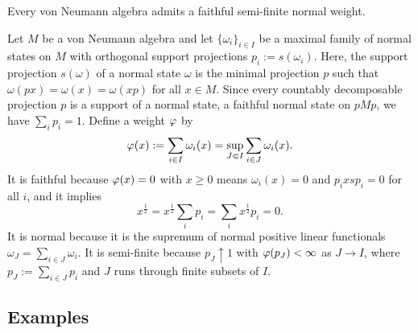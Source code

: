 \documentclass{../../small}
\begin{document}
\begin{prop}
Every von Neumann algebra admits a faithful semi-finite normal weight.
\end{prop}
\begin{pf}
Let $M$ be a von Neumann algebra and let $\{\omega_i\}_{i\in I}$ be a maximal family of normal states on $M$ with orthogonal support projections $p_i:=s(\omega_i)$.
Here, the support projection $s(\omega)$ of a normal state $\omega$ is the minimal projection $p$ such that $\omega(px)=\omega(x)=\omega(xp)$ for all $x\in M$.
Since every countably decomposable projection $p$ is a support of a normal state, a faithful normal state on $pMp$, we have $\sum_ip_i=1$.
Define a weight $\varphi$ by
\[\varphi(x):=\sum_{i\in I}\omega_i(x)=\sup_{J\Subset I}\sum_{i\in J}\omega_i(x).\]
It is faithful because $\varphi(x)=0$ with $x\ge0$ means $\omega_i(x)=0$ and $p_ixsp_i=0$ for all $i$, and it implies
\[x^{\frac12}=x^{\frac12}\sum_ip_i=\sum_ix^{\frac12}p_i=0.\]
It is normal because it is the supremum of normal positive linear functionals $\omega_J=\sum_{i\in J}\omega_i$.
It is semi-finite because $p_J\uparrow1$ with $\varphi(p_J)<\infty$ as $J\to I$, where $p_J:=\sum_{i\in J}p_i$ and $J$ runs through finite subsets of $I$.
\end{pf}



\subsection{Examples}
\end{document}

